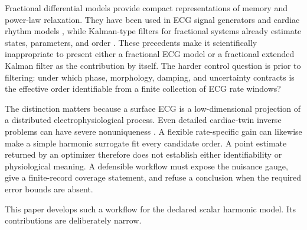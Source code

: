 \documentclass[11pt]{article}
\theoremstyle{definition}
\theoremstyle{remark}
\begin{document}
Fractional differential models provide compact representations of memory and
power-law relaxation.  They have been used in ECG signal generators and
cardiac rhythm models \cite{das2013,templos2021,takha2024}, while Kalman-type
filters for fractional systems already estimate states, parameters, and order
\cite{sierociuk2006,sierociuk2021,yu2026}.  These precedents make it
scientifically inappropriate to present either a fractional ECG model or a
fractional extended Kalman filter as the contribution by itself.  The harder
control question is prior to filtering: under which phase, morphology,
damping, and uncertainty contracts is the effective order identifiable from
a finite collection of ECG rate windows?

The distinction matters because a surface ECG is a low-dimensional projection
of a distributed electrophysiological process.  Even detailed cardiac-twin
inverse problems can have severe nonuniqueness
\cite{gillette2021,grandits2025}.  A flexible rate-specific gain can likewise
make a simple harmonic surrogate fit every candidate order.  A point estimate
returned by an optimizer therefore does not establish either identifiability
or physiological meaning.  A defensible workflow must expose the nuisance
gauge, give a finite-record coverage statement, and refuse a conclusion when
the required error bounds are absent.

This paper develops such a workflow for the declared scalar harmonic model.
Its contributions are deliberately narrow.
\end{document}
